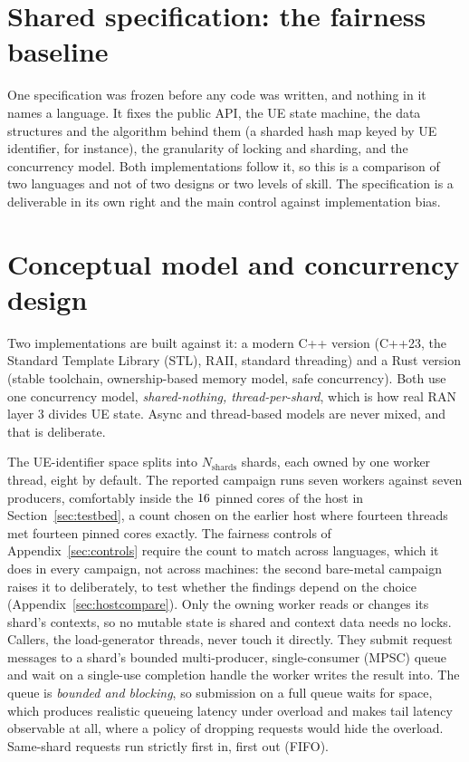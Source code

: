 \documentclass[english,oneside,a4paper,censored,csm,software-track-2020]{HYthesisML}
\begin{document}
\begin{appendices}
\section{Shared specification: the fairness baseline}
\label{sec:fairness}
One specification was frozen before any code was written, and nothing in it names a language. It
fixes the public API, the UE state machine, the data structures and the algorithm behind them (a
sharded hash map keyed by UE identifier, for instance), the granularity of locking and sharding,
and the concurrency model. Both implementations follow it, so this is a comparison of two
languages and not of two designs or two levels of skill. The specification is a deliverable in its
own right and the main control against implementation bias.

\section{Conceptual model and concurrency design}\label{sec:concurrency}
Two implementations are built against it: a modern C++ version (C++23, the Standard Template
Library (STL), RAII, standard threading) and a Rust version (stable toolchain, ownership-based
memory model, safe concurrency). Both use one concurrency model, \emph{shared-nothing,
thread-per-shard}, which is how real RAN layer 3 divides UE state. Async and thread-based models
are never mixed, and that is deliberate.

The UE-identifier space splits into $N_{\text{shards}}$ shards, each owned by one worker thread,
eight by default. The reported campaign runs seven workers against seven producers, comfortably
inside the $16$ pinned cores of the host in Section~\ref{sec:testbed}, a count
chosen on the earlier host where fourteen threads met fourteen pinned cores exactly. The fairness
controls of Appendix~\ref{sec:controls} require the count to match across languages, which it does
in every campaign, not across machines: the second bare-metal campaign raises it to \BmShards{}
deliberately, to test whether the findings depend on the choice
(Appendix~\ref{sec:hostcompare}). Only the owning worker reads or changes its shard's contexts, so
no mutable state is shared and context data needs no locks. Callers, the load-generator threads,
never touch it directly. They submit request messages to a shard's bounded multi-producer,
single-consumer (MPSC) queue and wait on a single-use completion handle the worker writes the
result into. The queue is \emph{bounded and blocking}, so submission on a full queue waits for
space, which produces realistic queueing latency under overload and makes tail latency observable
at all, where a policy of dropping requests would hide the overload. Same-shard requests run
strictly first in, first out (FIFO).


\end{appendices}
\end{document}
